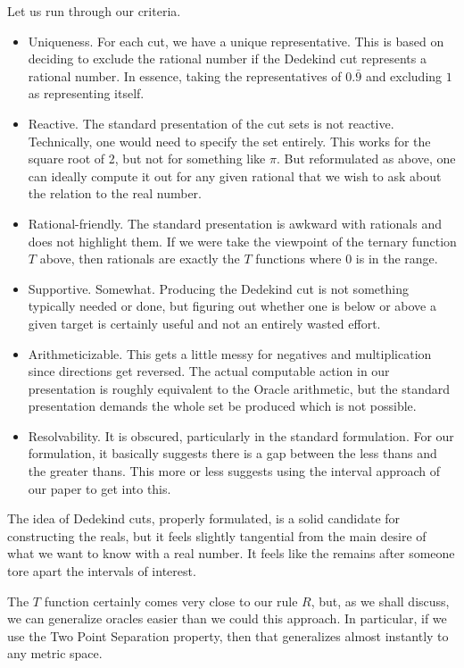 \documentclass[12pt]{article}
\theoremstyle{remark}
\begin{document}
Let us run through our criteria. 

\begin{itemize}
    \item Uniqueness. For each cut, we have a unique representative. This is based on deciding to exclude the rational number if the Dedekind cut represents a rational number. In essence, taking the representatives of $0.\bar{9}$ and excluding $1$ as representing itself. 
    \item Reactive. The standard presentation of the cut sets is not reactive. Technically, one would need to specify the set entirely. This works for the square root of 2, but not for something like $\pi$. But reformulated as above, one can ideally compute it out for any given rational that we wish to ask about the relation to the real number. 
    \item Rational-friendly. The standard presentation is awkward with rationals and does not highlight them. If we were take the viewpoint of the ternary function $T$ above, then rationals are exactly the $T$ functions where $0$ is in the range. 
    \item Supportive. Somewhat. Producing the Dedekind cut is not something typically needed or done, but figuring out whether one is below or above a given target is certainly useful and not an entirely wasted effort. 
    \item Arithmeticizable. This gets a little messy for negatives and multiplication since directions get reversed. The actual computable action in our presentation is roughly equivalent to the Oracle arithmetic, but the standard presentation demands the whole set be produced which is not possible.
    \item Resolvability. It is obscured, particularly in the standard formulation. For our formulation, it basically suggests there is a gap between the less thans and the greater thans. This more or less suggests using the interval approach of our paper to get into this. 
\end{itemize}

The idea of Dedekind cuts, properly formulated, is a solid candidate for constructing the reals, but it feels slightly tangential from the main desire of what we want to know with a real number. It feels like the remains after someone tore apart the intervals of interest. 

The $T$ function certainly comes very close to our rule $R$, but, as we shall discuss, we can generalize oracles easier than we could this approach. In particular, if we use the Two Point Separation property, then that generalizes almost instantly to any metric space. 
\end{document}
